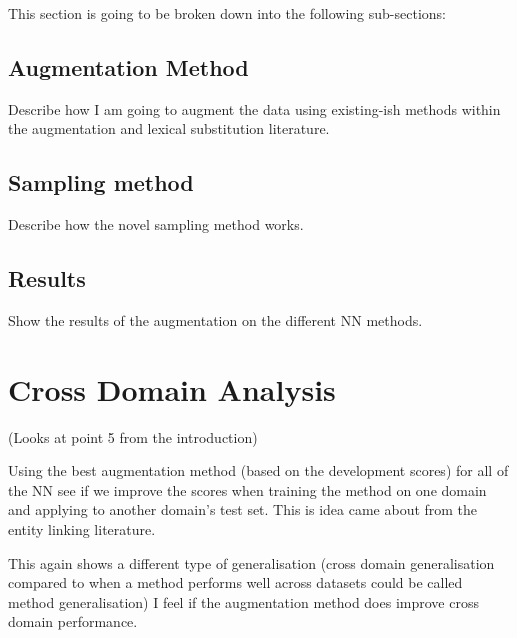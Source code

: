 This section is going to be broken down into the following sub-sections:
\subsection{Augmentation Method}
Describe how I am going to augment the data using existing-ish methods within the augmentation and lexical substitution literature.
\subsection{Sampling method}
Describe how the novel sampling method works.
\subsection{Results}
Show the results of the augmentation on the different NN methods.
\section{Cross Domain Analysis}
(Looks at point 5 from the introduction)

Using the best augmentation method (based on the development scores) for all of the NN see if we improve the scores when training the method on one domain and applying to another domain's test set. This is idea came about from the entity linking literature.

This again shows a different type of generalisation (cross domain generalisation compared to when a method performs well across datasets could be called method generalisation) I feel if the augmentation method does improve cross domain performance.